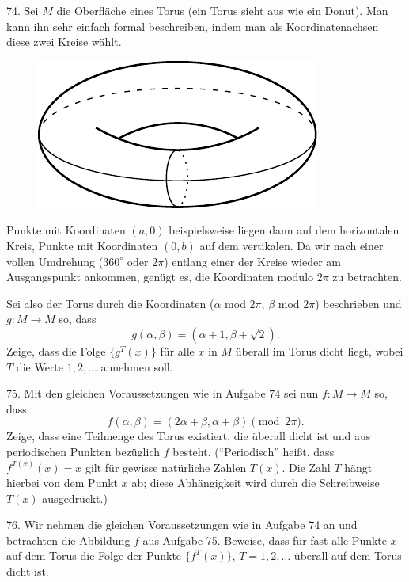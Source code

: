 \begin{problem}{74.}
	Sei $M$ die Oberfläche eines Torus (ein Torus sieht aus wie ein Donut). Man kann ihn sehr einfach formal beschreiben, indem man als Koordinatenachsen diese zwei Kreise wählt. 
	\begin{figure}
		\includegraphics{74_torus} 
	\end{figure}

	Punkte mit Koordinaten $(a,0)$ beispielsweise liegen dann auf dem horizontalen Kreis, Punkte mit Koordinaten $(0,b)$ auf dem vertikalen. 
	Da wir nach einer vollen Umdrehung ($360^\circ$ oder $2\pi$) entlang einer der Kreise wieder am Ausgangspunkt ankommen, genügt es, die Koordinaten modulo $2\pi$ zu betrachten.
	
	Sei also der Torus durch die Koordinaten ($\alpha$ mod $2\pi$, $\beta$ mod $2\pi$) beschrieben und $g: M\to M$ so, dass
	\begin{equation*}
		g(\alpha, \beta)=(\alpha+1, \beta+ \sqrt{2}).
	\end{equation*}
	Zeige, dass die Folge $\{g^T (x)\}$ für alle $x$ in $M$ überall im Torus dicht liegt, wobei $T$ die Werte $1,2,\dots$ annehmen soll. 
\end{problem}

\begin{problem}{75.}
	Mit den gleichen Voraussetzungen wie in Aufgabe 74 sei nun $f: M\to M$ so, dass
	\begin{equation*}
		f(\alpha, \beta)=(2\alpha+\beta,\alpha+\beta) \pmod {2\pi}.
	\end{equation*}
	Zeige, dass eine Teilmenge des Torus existiert, die überall dicht ist und aus periodischen Punkten bezüglich $f$ besteht. 
	(\enquote{Periodisch} heißt, dass $f^{T (x)} (x)=x$ gilt für gewisse natürliche Zahlen $T(x)$. Die Zahl $T$ hängt hierbei von dem Punkt $x$ ab; diese Abhängigkeit wird durch die Schreibweise $T(x)$ ausgedrückt.)
\end{problem}

\begin{problem}{76.}
	Wir nehmen die gleichen Voraussetzungen wie in Aufgabe 74 an und betrachten die Abbildung $f$ aus Aufgabe 75. Beweise, dass für fast alle Punkte $x$ auf dem Torus die Folge der Punkte $\{f^T (x)\}$, $T=1, 2, \dotsc$ überall auf dem Torus dicht ist. 
\end{problem}


